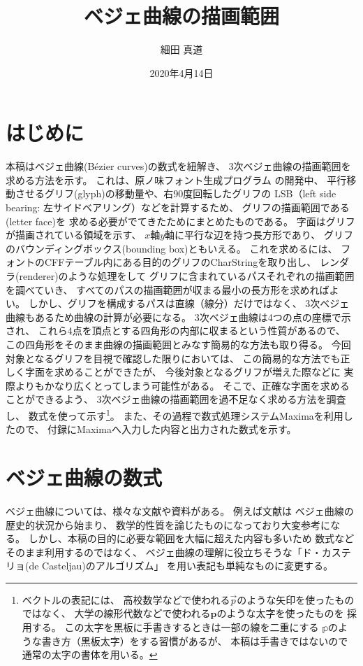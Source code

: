 \documentclass[dvipdfmx]{jsarticle}
\title{ベジェ曲線の描画範囲}
\author{細田 真道}
\date{2020年4月14日}
\newcommand\VectBold[1]{\boldsymbol{#1}}
\newcommand\VectBB[1]{\mathbb{#1}}
\newcommand\VectBold[1]{\symbf{#1}}
\newcommand\VectBB[1]{\symbb{#1}}
\newcommand\VectArrow[1]{\vec{#1}}
\begin{document}
\maketitle

\section{はじめに}

本稿はベジェ曲線(Bézier curves)の数式を紐解き、
3次ベジェ曲線の描画範囲を求める方法を示す。
これは、原ノ味フォント\cite{haranoaji}生成プログラム
\cite{haranoaji-generator}の開発中、
平行移動させるグリフ(glyph)の移動量や、右90度回転したグリフの
LSB（left side bearing: 左サイドベアリング）などを計算するため、
グリフの描画範囲である(letter face)を
求める必要がでてきたためにまとめたものである。
字面はグリフが描画されている領域を示す、
$x$軸$y$軸に平行な辺を持つ長方形であり、
グリフのバウンディングボックス(bounding box)ともいえる。
これを求めるには、
フォントのCFFテーブル内にある目的のグリフのCharStringを取り出し、
レンダラ(renderer)のような処理をして
グリフに含まれているパスそれぞれの描画範囲を調べていき、
すべてのパスの描画範囲が収まる最小の長方形を求めればよい。
しかし、グリフを構成するパスは直線（線分）だけではなく、
3次ベジェ曲線もあるため曲線の計算が必要になる。
3次ベジェ曲線は4つの点の座標で示され、
これら4点を頂点とする四角形の内部に収まるという性質があるので、
この四角形をそのまま曲線の描画範囲とみなす簡易的な方法も取り得る。
今回対象となるグリフを目視で確認した限りにおいては、
この簡易的な方法でも正しく字面を求めることができたが、
今後対象となるグリフが増えた際などに
実際よりもかなり広くとってしまう可能性がある。
そこで、正確な字面を求めることができるよう、
3次ベジェ曲線の描画範囲を過不足なく求める方法を調査し、
数式を使って示す\footnote{%
  ベクトルの表記には、
  高校数学などで使われる$\VectArrow{p}$のような矢印を使ったものではなく、
  大学の線形代数などで使われる$\VectBold{p}$のような太字を使ったものを
  採用する。
  この太字を黒板に手書きするときは一部の線を二重にする
  $\VectBB{p}$のような書き方（黒板太字）をする習慣があるが、
  本稿は手書きではないので通常の太字の書体を用いる。
}。
また、その過程で数式処理システムMaximaを利用したので、
付録にMaximaへ入力した内容と出力された数式を示す。

\section{ベジェ曲線の数式}

ベジェ曲線については、様々な文献や資料がある。
例えば文献\cite{sakane}は
ベジェ曲線の歴史的状況から始まり、
数学的性質を論じたものになっており大変参考になる。
しかし、本稿の目的に必要な範囲を大幅に超えた内容も多いため
数式などそのまま利用するのではなく、
ベジェ曲線の理解に役立ちそうな「ド・カステリョ(de Casteljau)のアルゴリズム」
を用い表記も単純なものに変更する。
\end{document}
